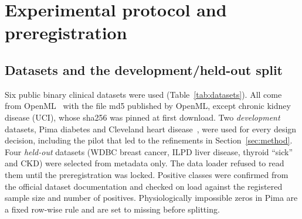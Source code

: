 \section{Experimental protocol and preregistration}
\label{sec:protocol}

\subsection{Datasets and the development/held-out split}
Six public binary clinical datasets were used (Table~\ref{tab:datasets}). All come
from OpenML~\cite{vanschoren2014} with the file md5 published by OpenML, except
chronic kidney disease (UCI), whose sha256 was pinned at first download. Two
\emph{development} datasets, Pima diabetes and Cleveland heart
disease~\cite{detrano1989}, were used for every design decision, including the pilot
that led to the refinements in Section~\ref{sec:method}. Four \emph{held-out}
datasets (WDBC breast cancer, ILPD liver disease, thyroid ``sick'' and CKD) were
selected from metadata only. The data loader refused to read them until the
preregistration was locked. Positive classes were confirmed from the official dataset
documentation and checked on load against the registered sample size and number of
positives. Physiologically impossible zeros in Pima are a fixed row-wise rule and are
set to missing before splitting.



